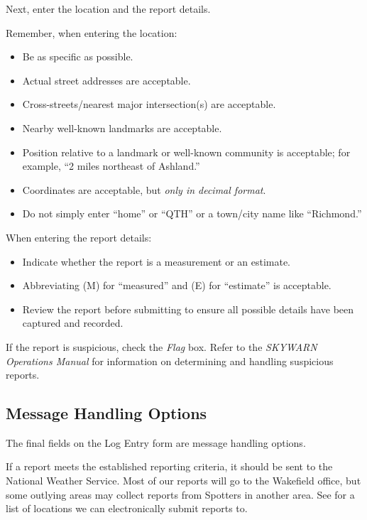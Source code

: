 \documentclass[pdflatex,letterpaper,twoside,12pt]{book}
\begin{document}

Next, enter the location and the report details.

Remember, when entering the location:

\begin{itemize}
\item Be as specific as possible.
\item Actual street addresses are acceptable.
\item Cross-streets/nearest major intersection(s) are acceptable.
\item Nearby well-known landmarks are acceptable.
\item Position relative to a landmark or well-known community is acceptable;  for example, ``2 miles northeast of Ashland.''
\item Coordinates are acceptable, but \emph{only in decimal format}.
\item Do not simply enter ``home'' or ``QTH'' or a town/city name like ``Richmond.''
\end{itemize}

When entering the report details:

\begin{itemize}
\item Indicate whether the report is a measurement or an estimate.
\item Abbreviating (M) for ``measured'' and (E) for ``estimate'' is acceptable.
\item Review the report before submitting to ensure all possible details have been captured and recorded.
\end{itemize}

If the report is suspicious, check the \emph{Flag} box.  Refer to the \emph{SKYWARN Operations Manual} for information on determining and handling suspicious reports. 

\subsection{Message Handling Options}

The final fields on the Log Entry form are message handling options.

If a report meets the established reporting criteria, it should be sent to the National Weather Service.  Most of our reports will go to the Wakefield office, but some outlying areas may collect reports from Spotters in another area.  See  for a list of locations we can electronically submit reports to.
\end{document}
